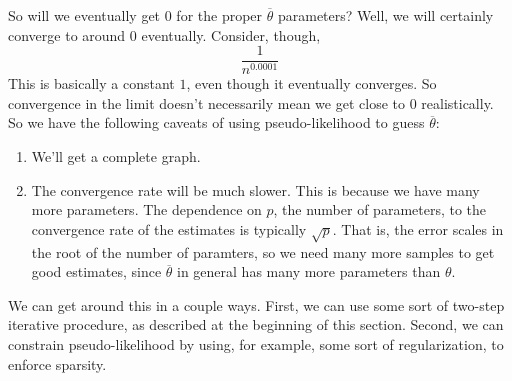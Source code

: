 \documentclass{article}
\begin{document}
So will we eventually get $0$ for the proper $\overline\theta$ parameters?
Well,
we will certainly converge to around 0 eventually.
Consider, though,
$$
\frac{1}{n^{0.0001}}
$$
This is basically a constant $1$, even though it eventually converges.
So convergence in the limit doesn't necessarily mean we get close to $0$ realistically.
So we have the following caveats of using pseudo-likelihood to guess $\overline\theta$:
\begin{enumerate}
	\item
	We'll get a complete graph.
	
	\item
	The convergence rate will be much slower.
	This is because we have many more parameters.
	The dependence on $p$, the number of parameters, to the convergence rate of the estimates is typically $\sqrt p$.
	That is, the error scales in the root of the number of paramters, so we need many more samples to get good estimates, since $\overline\theta$ in general has many more parameters than $\theta$.
\end{enumerate}
We can get around this in a couple ways.
First, we can use some sort of two-step iterative procedure, as described at the beginning of this section.
Second, we can constrain pseudo-likelihood by using, for example, some sort of regularization, to enforce sparsity.

%
\end{document}
